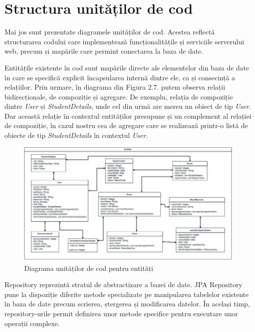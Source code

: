 \documentclass[12pt,a4paper]{report}
\theoremstyle{definition}
\theoremstyle{remark}
\begin{document}
\section{Structura unităților de cod}
\par Mai jos sunt prezentate diagramele unităților de cod. Acestea reflectă structurarea codului care implementează funcționalitățile și serviciile serverului web, precum și mapările care permint conectarea la baza de date.

\par Entitățile existente în cod sunt mapările directe ale elementelor din baza de date în care se specifică explicit încapsularea internă dintre ele, ca și consecință a relațiilor. Prin urmare, în diagrama din Figura 2.7. putem observa relații bidirecționale, de compoziție și agregare. De exemplu, relația de compoziție dintre {\itshape User} și {\itshape StudentDetails}, unde cel din urmă are mereu un obiect de tip {\itshape User}. Dar această relație în contextul entităților presupune și un complement al relației de compoziție, în cazul nostru cea de agregare care se realizează printr-o listă de obiecte de tip {\itshape StudentDetails} în contextul {\itshape User}.

\begin{figure}[H]
    \centering
    \includegraphics[width=1\linewidth]{resurse/diagrame/uvtdorms1.2.drawio.png}
    \caption{Diagrama unităților de cod pentru entități}
\end{figure}

\par Repository reprezintă stratul de abstractizare a bazei de date. JPA Repository pune la dispoziție diferite metode specializate pe manipularea tabelelor existente în baza de date precum scrierea, ștergerea și modificarea datelor. În același timp, \textnormal{re\-po\-si\-to\-ry-urile} permit definirea unor metode specifice pentru executare unor operații complexe.
\end{document}
